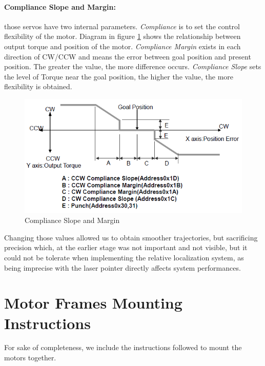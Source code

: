 \paragraph{Compliance Slope and Margin:} those servos have two internal parameters. \emph{Compliance} is to set the control flexibility of the motor.
Diagram in figure \ref{fig:compliance} shows the relationship between output torque and position of the motor. \emph{Compliance Margin} exists in each direction of \acs{CW}/\acs{CCW} and means the error between goal position and present position. The greater the value, the more difference occurs. \emph{Compliance Slope} sets the level of Torque near the goal position, the higher the value, the more flexibility is obtained.
\begin{figure}
	\centering
	\includegraphics[width=\textwidth]{img/compliance.png}%
	\caption{Compliance Slope and Margin}
	\label{fig:compliance}
\end{figure}
Changing those values allowed us to obtain smoother trajectories, but sacrificing precision which, at the earlier stage was not important and not visible, but it could not be tolerate when implementing the relative localization system, as being imprecise with the laser pointer directly affects system performances.


\section{Motor Frames Mounting Instructions}
For sake of completeness, we include the instructions followed to mount the motors together.

